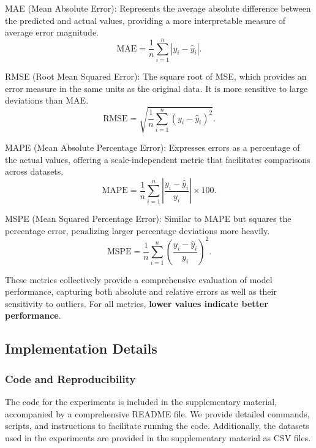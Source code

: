MAE (Mean Absolute Error): Represents the average absolute difference between the predicted and actual values, providing a more interpretable measure of average error magnitude.
\begin{equation}
\text{MAE} = \frac{1}{n} \sum_{i=1}^n \left| y_i - \hat{y}_i \right|.
\end{equation}

RMSE (Root Mean Squared Error): The square root of MSE, which provides an error measure in the same units as the original data. It is more sensitive to large deviations than MAE.
\begin{equation}
\text{RMSE} = \sqrt{\frac{1}{n} \sum_{i=1}^n \left( y_i - \hat{y}_i \right)^2}.
\end{equation}

MAPE (Mean Absolute Percentage Error): Expresses errors as a percentage of the actual values, offering a scale-independent metric that facilitates comparisons across datasets.
\begin{equation}
\text{MAPE} = \frac{1}{n} \sum_{i=1}^n \left| \frac{y_i - \hat{y}_i}{y_i} \right| \times 100.
\end{equation}

MSPE (Mean Squared Percentage Error): Similar to MAPE but squares the percentage error, penalizing larger percentage deviations more heavily.
\begin{equation}
\text{MSPE} = \frac{1}{n} \sum_{i=1}^n \left( \frac{y_i - \hat{y}_i}{y_i} \right)^2.
\end{equation}

These metrics collectively provide a comprehensive evaluation of model performance, capturing both absolute and relative errors as well as their sensitivity to outliers. For all metrics, \textbf{lower values indicate better performance}.



\subsection{Implementation Details}
\label{ap: implementation details}

\subsubsection{Code and Reproducibility}
The code for the experiments is included in the supplementary material, accompanied by a comprehensive README file. We provide detailed commands, scripts, and instructions to facilitate running the code. Additionally, the datasets used in the experiments are provided in the supplementary material as CSV files.


